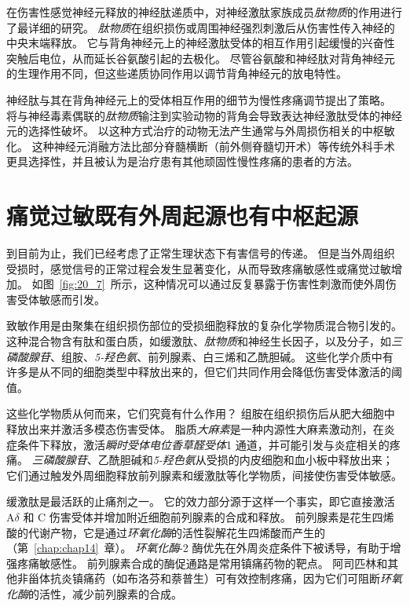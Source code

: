 在伤害性感觉神经元释放的神经肽递质中，对神经激肽家族成员\textit{肽物质}的作用进行了最详细的研究。
\textit{肽物质}在组织损伤或周围神经强烈刺激后从伤害性传入神经的中央末端释放。
它与背角神经元上的神经激肽受体的相互作用引起缓慢的兴奋性突触后电位，从而延长谷氨酸引起的去极化。
尽管谷氨酸和神经肽对背角神经元的生理作用不同，但这些递质协同作用以调节背角神经元的放电特性。


神经肽与其在背角神经元上的受体相互作用的细节为慢性疼痛调节提出了策略。
将与神经毒素偶联的\textit{肽物质}输注到实验动物的背角会导致表达神经激肽受体的神经元的选择性破坏。
以这种方式治疗的动物无法产生通常与外周损伤相关的中枢敏化。
这种神经元消融方法比部分脊髓横断（前外侧脊髓切开术）等传统外科手术更具选择性，并且被认为是治疗患有其他顽固性慢性疼痛的患者的方法。



\section{痛觉过敏既有外周起源也有中枢起源}

到目前为止，我们已经考虑了正常生理状态下有害信号的传递。
但是当外周组织受损时，感觉信号的正常过程会发生显著变化，从而导致疼痛敏感性或痛觉过敏增加。
如图~\ref{fig:20_7}~所示，这种情况可以通过反复暴露于伤害性刺激而使外周伤害受体敏感而引发。


致敏作用是由聚集在组织损伤部位的受损细胞释放的复杂化学物质混合物引发的。
这种混合物含有肽和蛋白质，如缓激肽、\textit{肽物质}和神经生长因子，以及分子，如\textit{三磷酸腺苷}、组胺、\textit{5-羟色氨}、前列腺素、白三烯和乙酰胆碱。
这些化学介质中有许多是从不同的细胞类型中释放出来的，但它们共同作用会降低伤害受体激活的阈值。


这些化学物质从何而来，它们究竟有什么作用？
组胺在组织损伤后从肥大细胞中释放出来并激活多模态伤害受体。
脂质\textit{大麻素}是一种内源性大麻素激动剂，在炎症条件下释放，激活\textit{瞬时受体电位香草醛受体}1 通道，并可能引发与炎症相关的疼痛。
\textit{三磷酸腺苷}、乙酰胆碱和\textit{5-羟色氨}从受损的内皮细胞和血小板中释放出来；
它们通过触发外周细胞释放前列腺素和缓激肽等化学物质，间接使伤害受体敏感。


缓激肽是最活跃的止痛剂之一。
它的效力部分源于这样一个事实，即它直接激活 A$\delta$ 和 C 伤害受体并增加附近细胞前列腺素的合成和释放。
前列腺素是花生四烯酸的代谢产物，它是通过\textit{环氧化酶}的活性裂解花生四烯酸而产生的（第~\ref{chap:chap14}~章）。
\textit{环氧化酶}-2 酶优先在外周炎症条件下被诱导，有助于增强疼痛敏感性。
前列腺素合成的酶促通路是常用镇痛药物的靶点。
阿司匹林和其他非甾体抗炎镇痛药（如布洛芬和萘普生）可有效控制疼痛，因为它们可阻断\textit{环氧化酶}的活性，减少前列腺素的合成。



